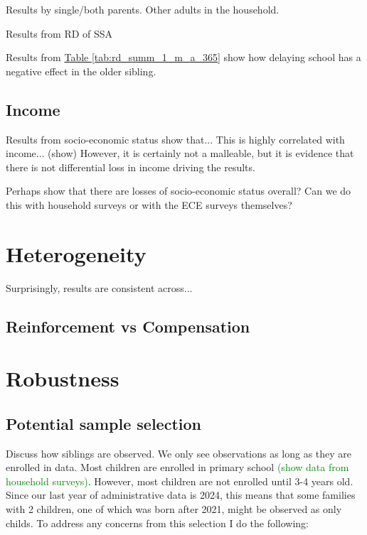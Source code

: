 Results by single/both parents. Other adults in the household.

Results from RD of SSA

Results from \hyperref[tab:rd_summ_1_m_a_365]{Table \ref{tab:rd_summ_1_m_a_365}} show how delaying school has a negative effect in the older sibling. 

\subsection{Income}

Results from socio-economic status show that... 
This is highly correlated with income... (show)
However, it is certainly not a malleable, but it is evidence that there is not differential loss in income driving the results.

Perhaps show that there are losses of socio-economic status overall? Can we do this with household surveys or with the ECE surveys themselves?

\section{Heterogeneity}\label{sec:heterogeneity}

Surprisingly, results are consistent across...

\subsection{Reinforcement vs Compensation}

\section{Robustness}\label{sec:robustness}

\subsection{Potential sample selection}

Discuss how siblings are observed. We only see observations as long as they are enrolled in data. Most children are enrolled in primary school \textcolor{green}{(show data from household surveys)}. However, most children are not enrolled until 3-4 years old. Since our last year of administrative data is 2024, this means that some families with 2 children, one of which was born after 2021, might be observed as only childs. To address any concerns from this selection I do the following:


